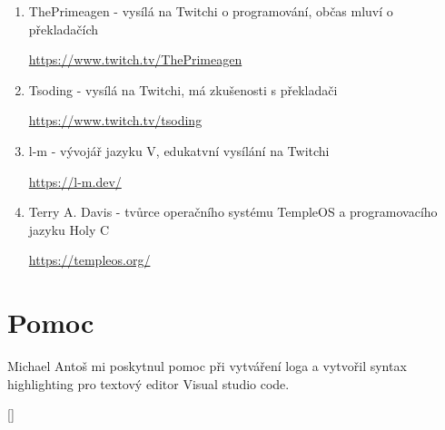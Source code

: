 \documentclass[12pt, a4paper,
twoside,        %
openright
]{report}
\let\oldchapter\chapter
\renewcommand{\chapter}{
	\clearpage
	\pagestyle{fancy}
	\oldchapter
}
\begin{document}
\begin{enumerate}
	\item ThePrimeagen - vysílá na Twitchi o programování, občas mluví o překladačích
	
	\url{https://www.twitch.tv/ThePrimeagen}
	\item Tsoding - vysílá na Twitchi, má zkušenosti s překladači
	
	\url{https://www.twitch.tv/tsoding}
	\item l-m - vývojář jazyku V, edukatvní vysílání na Twitchi
	
	\url{https://l-m.dev/}
	\item Terry A. Davis - tvůrce operačního systému TempleOS a programovacího jazyku Holy C
	
	\url{https://templeos.org/}
\end{enumerate}

\section*{Pomoc}

Michael Antoš mi poskytnul pomoc při vytváření loga a vytvořil syntax highlighting pro textový editor Visual studio code.

	
\appendix %
	
\titleformat{\chapter}[block]{\scshape\bfseries\LARGE}{Příloha \thechapter}{10pt}{\vspace{0pt}}[\vspace{-22pt}] %
	

	
	
\end{document}
